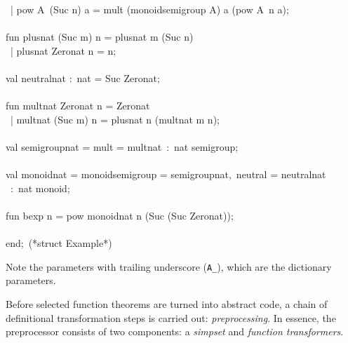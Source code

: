 \begin{isabellebody}
\begin{isamarkuptext}
\hspace*{0pt} ~| pow A{}~(Suc n) a = mult (monoid{}semigroup A{}) a (pow A{}~n a);\\
\hspace*{0pt}\\
\hspace*{0pt}fun plus{}nat (Suc m) n = plus{}nat m (Suc n)\\
\hspace*{0pt} ~| plus{}nat Zero{}nat n = n;\\
\hspace*{0pt}\\
\hspace*{0pt}val neutral{}nat :~nat = Suc Zero{}nat;\\
\hspace*{0pt}\\
\hspace*{0pt}fun mult{}nat Zero{}nat n = Zero{}nat\\
\hspace*{0pt} ~| mult{}nat (Suc m) n = plus{}nat n (mult{}nat m n);\\
\hspace*{0pt}\\
\hspace*{0pt}val semigroup{}nat = {}mult = mult{}nat{}~:~nat semigroup;\\
\hspace*{0pt}\\
\hspace*{0pt}val monoid{}nat = {}monoid{}semigroup = semigroup{}nat,~neutral = neutral{}nat{}\\
\hspace*{0pt} ~:~nat monoid;\\
\hspace*{0pt}\\
\hspace*{0pt}fun bexp n = pow monoid{}nat n (Suc (Suc Zero{}nat));\\
\hspace*{0pt}\\
\hspace*{0pt}end;~(*struct Example*)%
\end{isamarkuptext}%
\isamarkuptrue%
%
\endisatagquote
{\isafoldquote}%
%
\isadelimquote
%
\endisadelimquote
%
\begin{isamarkuptext}%
\noindent Note the parameters with trailing underscore (\verb|A_|),
    which are the dictionary parameters.%
\end{isamarkuptext}%
\isamarkuptrue%
%
\isamarkuptrue%
%
\begin{isamarkuptext}%
Before selected function theorems are turned into abstract
  code, a chain of definitional transformation steps is carried
  out: \emph{preprocessing}.  In essence, the preprocessor
  consists of two components: a \emph{simpset} and \emph{function transformers}.


\end{isamarkuptext}
\end{isabellebody}
